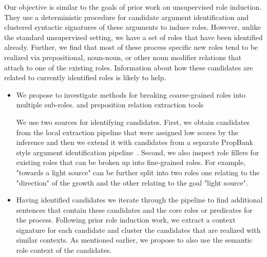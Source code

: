Our objective is similar to the goals of prior work on unsupervised role induction. They use a deterministic procedure for candidate argument identification and clustered syntactic signatures of these arguments to induce roles. However, unlike the standard unsupervised setting, we have a set of roles that have been identified already. Further, we find that most of these process specific new roles tend to be realized via prepositional, noun-noun, or other noun modifier relations that attach to one of the existing roles. Information about how these candidates are related to currently identified roles is likely to help.

\begin{itemize}
\item We propose to investigate methods for breaking coarse-grained roles into multiple sub-roles.
 and preposition relation extraction tools 

We use two sources for identifying candidates. 
First, we obtain candidates from the local extraction pipeline that were assigned low scores by the inference and then we extend it with candidates from a separate PropBank style argument identification pipeline~\cite{}. Second, we also inspect role fillers for existing roles that can be broken up into fine-grained roles. For example, "towards a light source" can be further split into two roles one relating to the "direction" of the growth and the other relating to the goal "light source".

\item Having identified candidates we iterate through the pipeline to find additional sentences that contain these candidates and the core roles or predicates for the process. Following prior role induction work, we extract a context signature for each candidate and cluster the candidates that are realized with similar contexts. As mentioned earlier, we propose to also use the semantic role context of the candidates. 

\end{itemize}







